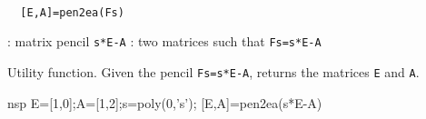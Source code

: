 
\begin{mandesc}
   \\ %
\end{mandesc}
\begin{calling_sequence}
\begin{verbatim}
  [E,A]=pen2ea(Fs)  
\end{verbatim}
\end{calling_sequence}
\begin{parameters}
  \begin{varlist}
    : matrix pencil \verb!s*E-A!
    : two matrices such that \verb!Fs=s*E-A!
  \end{varlist}
\end{parameters}
\begin{mandescription}
  Utility function. Given the pencil \verb!Fs=s*E-A!,
  returns the matrices \verb!E! and \verb!A!.
\end{mandescription}
\begin{examples}
  \begin{mintednsp}{nsp}
    E=[1,0];A=[1,2];s=poly(0,'s');
    [E,A]=pen2ea(s*E-A)
  \end{mintednsp}
\end{examples}
